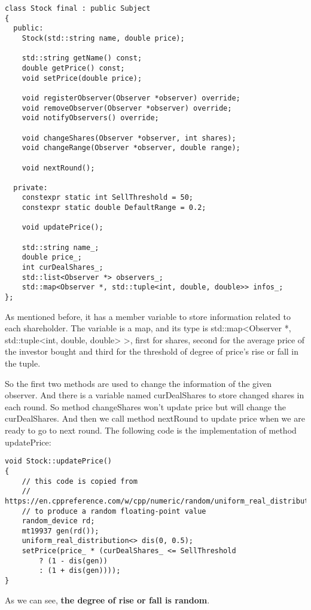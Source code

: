 \documentclass{article}
\begin{document}
\begin{lstlisting}
class Stock final : public Subject
{
  public:
    Stock(std::string name, double price);

    std::string getName() const;
    double getPrice() const;
    void setPrice(double price);

    void registerObserver(Observer *observer) override;
    void removeObserver(Observer *observer) override;
    void notifyObservers() override;

    void changeShares(Observer *observer, int shares);
    void changeRange(Observer *observer, double range);

    void nextRound();

  private:
    constexpr static int SellThreshold = 50;
    constexpr static double DefaultRange = 0.2;

    void updatePrice();

    std::string name_;
    double price_;
    int curDealShares_;
    std::list<Observer *> observers_;
    std::map<Observer *, std::tuple<int, double, double>> infos_;
};
\end{lstlisting}

    As mentioned before, it has a member variable to store information related to each shareholder. The variable is a map, and its type is std::map<Observer *, std::tuple<int, double, double> >, first for shares, second for the average price of the investor bought and third for the threshold of degree of price's rise or fall in the tuple.
    
    So the first two methods are used to change the information of the given observer. And there is a variable named curDealShares to store changed shares in each round. So method changeShares won't update price but will change the curDealShares. And then we call method nextRound to update price when we are ready to go to next round. The following code is the implementation of method updatePrice:
    
\begin{lstlisting}
void Stock::updatePrice()
{
    // this code is copied from
    // https://en.cppreference.com/w/cpp/numeric/random/uniform_real_distribution
    // to produce a random floating-point value
    random_device rd;
    mt19937 gen(rd());
    uniform_real_distribution<> dis(0, 0.5);
    setPrice(price_ * (curDealShares_ <= SellThreshold
        ? (1 - dis(gen))
        : (1 + dis(gen))));
}
\end{lstlisting}

    As we can see, \textbf{the degree of rise or fall is random}.
\end{document}
